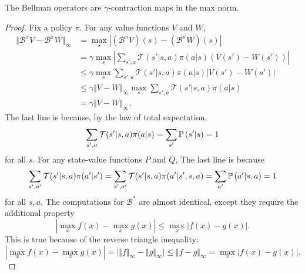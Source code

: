 \documentclass[twoside,10pt]{report}
\begin{document}
\begin{prop}
The Bellman operators are $\gamma$-contraction maps in the max norm.
\end{prop}
\begin{proof}
Fix a policy $\pi$. For any value functions $V$ and $W$,
        \begin{align*}
                {\Vert{\mathcal{B}^{\pi} V - \mathcal{B}^{\pi} W}\Vert}_{\infty} &= \max_{s} \left| (\mathcal{B}^{\pi} V)(s) - (\mathcal{B}^{\pi} W)(s) \right| \\                                                       &= \gamma \max_{s} \left| \sum_{s',a} \mathcal{T}(s'|s,a) \pi(a|s) \left( V(s') - W(s') \right) \right| \\                                                       &\leq \gamma \max_{s} \sum_{s',a} \mathcal{T}(s'|s,a) \pi(a|s) \left| V(s') - W(s') \right| \\                                                       &\leq \gamma {\Vert{V-W}\Vert}_{\infty} \max_{s} \sum_{s',a} \mathcal{T}(s'|s,a) \pi(a|s) \\                                                       &= \gamma {\Vert{V-W}\Vert}_{\infty}.
        \end{align*}
        The last line is because, by the law of total expectation,
	\[
		\sum_{s',a} \mathcal{T}(s'|s,a) \pi(a|s) = \sum_{s'} \P{ s' | s } = 1
	\]
	for all $s$. For any state-value functions $P$ and $Q$,
	The last line is because
	\[
		\sum_{s',a'} \mathcal{T}(s'|s,a) \pi(a'|s') = \sum_{s',a'} \mathcal{T}(s'|s,a)\pi(a'|s',s,a) = \sum_{a'} \P{a'|s,a } = 1
	\]
	for all $s,a$. The computations for $\mathcal{B}^{*}$ are almost identical, except they require the additional property \[\left| \max_{x} f(x) - \max_{x} g(x) \right| \leq \max_x \left| f(x) - g(x) \right|.\] This is true because of the reverse triangle inequality:
	\[
	\left| \max_{x}f(x) - \max_{x}g(x) \right| = \Big| {\Vert{f}\Vert}_{\infty} - {\Vert{g}\Vert}_{\infty} \Big| \leq {\Vert{f-g}\Vert}_{\infty} = \max_{x} \left| f(x) - g(x) \right|.
	\]
\end{proof}
\end{document}
